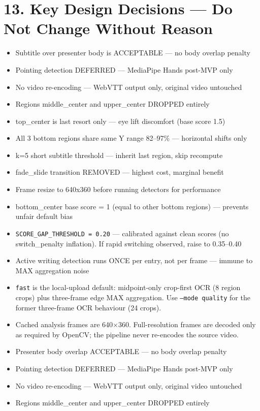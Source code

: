 \documentclass[11pt]{article}
\begin{document}
\section*{13. Key Design Decisions --- Do Not Change Without Reason}
\begin{itemize}[leftmargin=1.2em]
    \item Subtitle over presenter body is ACCEPTABLE --- no body overlap penalty
    \item Pointing detection DEFERRED --- MediaPipe Hands post-MVP only
    \item No video re-encoding --- WebVTT output only, original video untouched
    \item Regions middle\_center and upper\_center DROPPED entirely
    \item top\_center is last resort only --- eye lift discomfort (base score 1.5)
    \item All 3 bottom regions share same Y range 82--97\% --- horizontal shifts only
    \item k=5 short subtitle threshold --- inherit last region, skip recompute
    \item fade\_slide transition REMOVED --- highest cost, marginal benefit
    \item Frame resize to 640x360 before running detectors for performance
    \item bottom\_center base score = 1 (equal to other bottom regions) --- prevents unfair default bias
    \item \texttt{SCORE\_GAP\_THRESHOLD = 0.20} --- calibrated against clean scores (no switch\_penalty inflation). If rapid switching observed, raise to 0.35--0.40
    \item Active writing detection runs ONCE per entry, not per frame --- immune to MAX aggregation noise
    \item \texttt{fast} is the local-upload default: midpoint-only crop-first OCR (8 region crops) plus three-frame edge MAX aggregation. Use \texttt{--mode quality} for the former three-frame OCR behaviour (24 crops).
    \item Cached analysis frames are 640$\times$360. Full-resolution frames are decoded only as required by OpenCV; the pipeline never re-encodes the source video.
    \item Presenter body overlap ACCEPTABLE --- no body overlap penalty
    \item Pointing detection DEFERRED --- MediaPipe Hands post-MVP only
    \item No video re-encoding --- WebVTT output only, original video untouched
    \item Regions middle\_center and upper\_center DROPPED entirely
\end{itemize}
\end{document}
